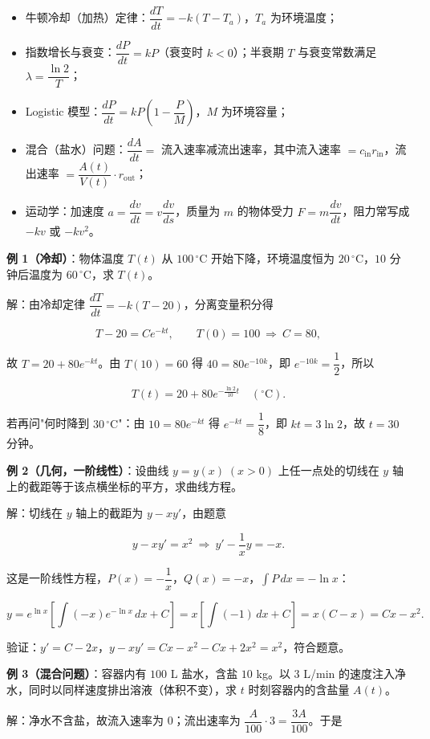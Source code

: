 \documentclass[11pt,openany,UTF8]{ctexbook}
\begin{document}
\begin{itemize}
\item 牛顿冷却（加热）定律：$\dfrac{dT}{dt}=-k\left(T-T_a\right)$，$T_a$ 为环境温度；
\item 指数增长与衰变：$\dfrac{dP}{dt}=kP$（衰变时 $k<0$）；半衰期 $T$ 与衰变常数满足 $\lambda=\dfrac{\ln 2}{T}$；
\item Logistic 模型：$\dfrac{dP}{dt}=kP\left(1-\dfrac PM\right)$，$M$ 为环境容量；
\item 混合（盐水）问题：$\dfrac{dA}{dt}=$ 流入速率减流出速率，其中流入速率 $=c_{\text{in}}r_{\text{in}}$，流出速率 $=\dfrac{A(t)}{V(t)}\cdot r_{\text{out}}$；
\item 运动学：加速度 $a=\dfrac{dv}{dt}=v\dfrac{dv}{ds}$，质量为 $m$ 的物体受力 $F=m\dfrac{dv}{dt}$，阻力常写成 $-kv$ 或 $-kv^{2}$。
\end{itemize}
\textbf{例 1（冷却）}：物体温度 $T(t)$ 从 $100\,^{\circ}\mathrm{C}$ 开始下降，环境温度恒为 $20\,^{\circ}\mathrm{C}$，$10$ 分钟后温度为 $60\,^{\circ}\mathrm{C}$，求 $T(t)$。

解：由冷却定律 $\dfrac{dT}{dt}=-k(T-20)$，分离变量积分得

\[T-20=Ce^{-kt},\qquad T(0)=100\ \Longrightarrow\ C=80,\]

故 $T=20+80e^{-kt}$。由 $T(10)=60$ 得 $40=80e^{-10k}$，即 $e^{-10k}=\dfrac12$，所以

\[T(t)=20+80e^{-\frac{\ln 2}{10}t}\quad (^{\circ}\mathrm{C}).\]

若再问"何时降到 $30\,^{\circ}\mathrm{C}$"：由 $10=80e^{-kt}$ 得 $e^{-kt}=\dfrac18$，即 $kt=3\ln 2$，故 $t=30$ 分钟。

\textbf{例 2（几何，一阶线性）}：设曲线 $y=y(x)\;(x>0)$ 上任一点处的切线在 $y$ 轴上的截距等于该点横坐标的平方，求曲线方程。

解：切线在 $y$ 轴上的截距为 $y-xy'$，由题意

\[y-xy'=x^{2}\ \Longrightarrow\ y'-\frac1xy=-x .\]

这是一阶线性方程，$P(x)=-\dfrac1x$，$Q(x)=-x$，$\int P\,dx=-\ln x$：

\[y=e^{\ln x}\left[\int(-x)e^{-\ln x}\,dx+C\right]=x\left[\int(-1)\,dx+C\right]=x(C-x)=Cx-x^{2}.\]

验证：$y'=C-2x$，$y-xy'=Cx-x^{2}-Cx+2x^{2}=x^{2}$，符合题意。

\textbf{例 3（混合问题）}：容器内有 $100$ L 盐水，含盐 $10$ kg。以 $3$ L/min 的速度注入净水，同时以同样速度排出溶液（体积不变），求 $t$ 时刻容器内的含盐量 $A(t)$。

解：净水不含盐，故流入速率为 $0$；流出速率为 $\dfrac{A}{100}\cdot 3=\dfrac{3A}{100}$。于是
\end{document}
